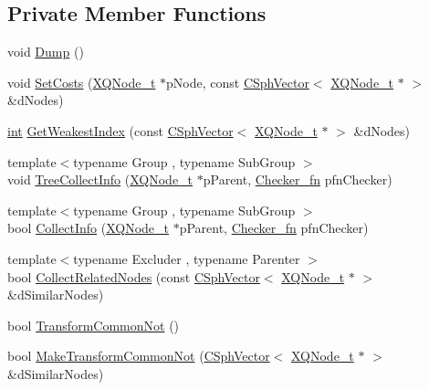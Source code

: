 \subsection*{Private Member Functions}
\begin{DoxyCompactItemize}
\item 
void \hyperlink{classCSphTransformation_a4ae30cdab92b2554e3f3900ba9623495}{Dump} ()
\item 
void \hyperlink{classCSphTransformation_abdfe91fb0965ce72e0fadf371317320d}{Set\-Costs} (\hyperlink{structXQNode__t}{X\-Q\-Node\-\_\-t} $\ast$p\-Node, const \hyperlink{classCSphVector}{C\-Sph\-Vector}$<$ \hyperlink{structXQNode__t}{X\-Q\-Node\-\_\-t} $\ast$ $>$ \&d\-Nodes)
\item 
\hyperlink{sphinxexpr_8cpp_a4a26e8f9cb8b736e0c4cbf4d16de985e}{int} \hyperlink{classCSphTransformation_a8c7f605c26b3e9f4f6fa9a8416a44a07}{Get\-Weakest\-Index} (const \hyperlink{classCSphVector}{C\-Sph\-Vector}$<$ \hyperlink{structXQNode__t}{X\-Q\-Node\-\_\-t} $\ast$ $>$ \&d\-Nodes)
\item 
{\footnotesize template$<$typename Group , typename Sub\-Group $>$ }\\void \hyperlink{classCSphTransformation_a7282eaf26946293ec43c1f7324b3f458}{Tree\-Collect\-Info} (\hyperlink{structXQNode__t}{X\-Q\-Node\-\_\-t} $\ast$p\-Parent, \hyperlink{classCSphTransformation_a4dd48bef2df238bb92404413ebdaf62d}{Checker\-\_\-fn} pfn\-Checker)
\item 
{\footnotesize template$<$typename Group , typename Sub\-Group $>$ }\\bool \hyperlink{classCSphTransformation_ac9662ee6c2b7a5a7789fbd92427fd821}{Collect\-Info} (\hyperlink{structXQNode__t}{X\-Q\-Node\-\_\-t} $\ast$p\-Parent, \hyperlink{classCSphTransformation_a4dd48bef2df238bb92404413ebdaf62d}{Checker\-\_\-fn} pfn\-Checker)
\item 
{\footnotesize template$<$typename Excluder , typename Parenter $>$ }\\bool \hyperlink{classCSphTransformation_a70d1fcce7428a924341d97bdd6371953}{Collect\-Related\-Nodes} (const \hyperlink{classCSphVector}{C\-Sph\-Vector}$<$ \hyperlink{structXQNode__t}{X\-Q\-Node\-\_\-t} $\ast$ $>$ \&d\-Similar\-Nodes)
\item 
bool \hyperlink{classCSphTransformation_a358e33dbe43a59898c456a6258492c8f}{Transform\-Common\-Not} ()
\item 
bool \hyperlink{classCSphTransformation_a33ada49b2aed4124a9d14478aedd4fa3}{Make\-Transform\-Common\-Not} (\hyperlink{classCSphVector}{C\-Sph\-Vector}$<$ \hyperlink{structXQNode__t}{X\-Q\-Node\-\_\-t} $\ast$ $>$ \&d\-Similar\-Nodes)

\end{DoxyCompactItemize}
